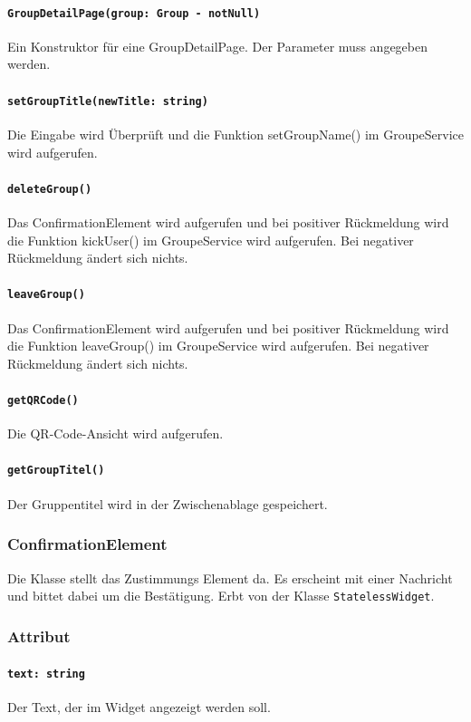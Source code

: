 \documentclass[parskip=full]{scrartcl}
\begin{document}
            \paragraph*{\texttt{GroupDetailPage(group: Group - notNull)}} Ein Konstruktor für eine GroupDetailPage. Der Parameter muss angegeben werden. 
            \paragraph*{\texttt{setGroupTitle(newTitle: string)}} Die Eingabe wird Überprüft und die Funktion setGroupName() im GroupeService wird aufgerufen.
            \paragraph*{\texttt{deleteGroup()}} Das ConfirmationElement wird aufgerufen und bei positiver Rückmeldung wird die Funktion kickUser() im GroupeService wird aufgerufen. Bei negativer Rückmeldung ändert sich nichts.
            \paragraph*{\texttt{leaveGroup()}} Das ConfirmationElement wird aufgerufen und bei positiver Rückmeldung wird die Funktion leaveGroup() im GroupeService wird aufgerufen. Bei negativer Rückmeldung ändert sich nichts.

            \paragraph*{\texttt{getQRCode()}} Die QR-Code-Ansicht wird aufgerufen.
            \paragraph*{\texttt{getGroupTitel()}} Der Gruppentitel wird in der Zwischenablage gespeichert.

    \subsubsection{ConfirmationElement} \label{sec:ConfirmationElement}
        Die Klasse stellt das Zustimmungs Element da. Es erscheint mit einer Nachricht und bittet dabei um die Bestätigung. Erbt von der Klasse \texttt{StatelessWidget}.
        \subsubsection*{Attribut}
            \paragraph*{\texttt{text: string}} Der Text, der im Widget angezeigt werden soll.
\end{document}
